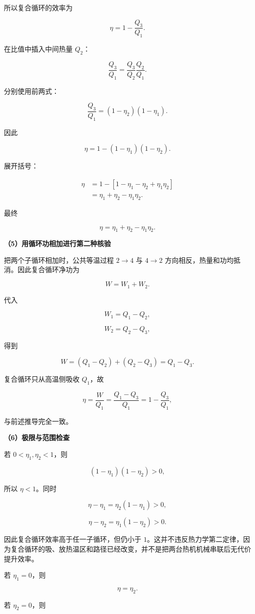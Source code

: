 \documentclass[12pt,a4paper,UTF8]{ctexart}
\begin{document}
所以复合循环的效率为

\[\eta=1-\frac{Q_3}{Q_1}.\]

在比值中插入中间热量 \(Q_2\)：

\[\frac{Q_3}{Q_1}
=\frac{Q_3}{Q_2}\frac{Q_2}{Q_1}.\]

分别使用前两式：

\[\frac{Q_3}{Q_1}
=(1-\eta_2)(1-\eta_1).\]

因此

\[\eta=1-(1-\eta_1)(1-\eta_2).\]

展开括号：

\[\begin{aligned}
\eta
&=1-[1-\eta_1-\eta_2+\eta_1\eta_2]\\
&=\eta_1+\eta_2-\eta_1\eta_2.
\end{aligned}\]

最终

\[\boxed{\eta=\eta_1+\eta_2-\eta_1\eta_2}.\]

\textbf{（5）用循环功相加进行第二种核验}

把两个子循环相加时，公共等温过程 \(2\to4\) 与 \(4\to2\)
方向相反，热量和功均抵消。因此复合循环净功为

\[W=W_1+W_2.\]

代入

\[W_1=Q_1-Q_2,\]

\[W_2=Q_2-Q_3,\]

得到

\[W=(Q_1-Q_2)+(Q_2-Q_3)=Q_1-Q_3.\]

复合循环只从高温侧吸收 \(Q_1\)，故

\[\eta=\frac W{Q_1}
=\frac{Q_1-Q_3}{Q_1}
=1-\frac{Q_3}{Q_1},\]

与前述推导完全一致。

\textbf{（6）极限与范围检查}

若 \(0<\eta_1,\eta_2<1\)，则

\[(1-\eta_1)(1-\eta_2)>0,\]

所以 \(\eta<1\)。同时

\[\eta-\eta_1=\eta_2(1-\eta_1)>0,\]

\[\eta-\eta_2=\eta_1(1-\eta_2)>0.\]

因此复合循环效率高于任一子循环，但仍小于
\(1\)。这并不违反热力学第二定律，因为复合循环的吸、放热温区和路径已经改变，并不是把两台热机机械串联后无代价提升效率。

若 \(\eta_1=0\)，则

\[\eta=\eta_2.\]

若 \(\eta_2=0\)，则
\end{document}
